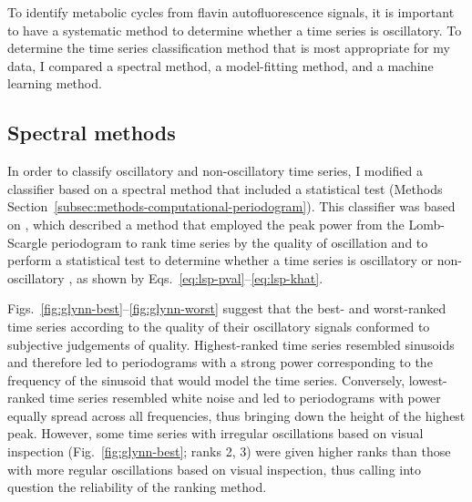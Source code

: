 To identify metabolic cycles from flavin autofluorescence signals, it is important to have a systematic method to determine whether a time series is oscillatory.
To determine the time series classification method that is most appropriate for my data, I compared a spectral method, a model-fitting method, and a machine learning method.


\subsection{Spectral methods}
\label{subsec:analysis-classification-spectral}

In order to classify oscillatory and non-oscillatory time series, I modified a classifier based on a spectral method that included a statistical test (Methods Section~\ref{subsec:methods-computational-periodogram}).
This classifier was based on \textcite{glynnDetectingPeriodicPatterns2006}, which described a method that employed the peak power from the Lomb-Scargle periodogram \parencite{lombLeastsquaresFrequencyAnalysis1976} to rank time series by the quality of oscillation and to perform a statistical test to determine whether a time series is oscillatory or non-oscillatory \parencite{scargleStudiesAstronomicalTime1982}, as shown by Eqs.\ \ref{eq:lsp-pval}--\ref{eq:lsp-khat}.

Figs.\ \ref{fig:glynn-best}--\ref{fig:glynn-worst} suggest that the best- and worst-ranked time series according to the quality of their oscillatory signals conformed to subjective judgements of quality.
Highest-ranked time series resembled sinusoids and therefore led to periodograms with a strong power corresponding to the frequency of the sinusoid that would model the time series.
Conversely, lowest-ranked time series resembled white noise and led to periodograms with power equally spread across all frequencies, thus bringing down the height of the highest peak.
However, some time series with irregular oscillations based on visual inspection (Fig.\ \ref{fig:glynn-best}; ranks 2, 3) were given higher ranks than those with more regular oscillations based on visual inspection, thus calling into question the reliability of the ranking method.

